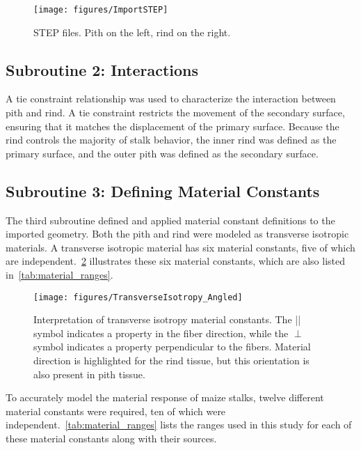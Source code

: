 \begin{figure}[htbp]
	\centering
	\texttt{[image: figures/ImportSTEP]}
	\caption[STEP files]{STEP files. Pith on the left, rind on the right.}
	\label{fig:ImportSTEP}
\end{figure}

\subsection{Subroutine 2: Interactions}
\label{ssec:subroutine_2_interactions}
A tie constraint relationship was used to characterize the interaction between pith and rind. A tie constraint restricts the movement of the secondary surface, ensuring that it matches the displacement of the primary surface. Because the rind controls the majority of stalk behavior, the inner rind was defined as the primary surface, and the outer pith was defined as the secondary surface.

\subsection{Subroutine 3: Defining Material Constants}
\label{ssec:subroutine_3_defining_material_constants}
The third subroutine defined and applied material constant definitions to the imported geometry. Both the pith and rind were modeled as transverse isotropic materials. A transverse isotropic material has six material constants, five of which are independent.~\cref{fig:TransverseIsotropy_Angled} illustrates these six material constants, which are also listed in~\cref{tab:material_ranges}.
\newline

\begin{figure}[htbp]
	\centering
	\texttt{[image: figures/TransverseIsotropy\_Angled]}
	\caption[Interpretation of transverse isotropy material constants.]{Interpretation of transverse isotropy material constants. The || symbol indicates a property in the fiber direction, while the ${\perp}$ symbol indicates a property perpendicular to the fibers. Material direction is highlighted for the rind tissue, but this orientation is also present in pith tissue.}
	\label{fig:TransverseIsotropy_Angled}
\end{figure}

To accurately model the material response of maize stalks, twelve different material constants were required, ten of which were independent.~\cref{tab:material_ranges} lists the ranges used in this study for each of these material constants along with their sources.

